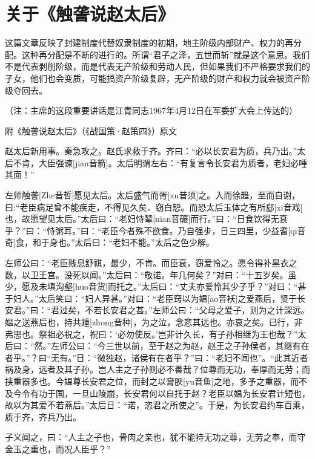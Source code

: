\section[关于《触詟说赵太后》（一九六七年四月）]{关于《触詟说赵太后》}


这篇文章反映了封建制度代替奴隶制度的初期，地主阶级内部财产、权力的再分配。这种再分配是不断的进行的。所谓“君子之泽，五世而斩”就是这个意思。我们不是代表剥削阶级，而是代表无产阶级和劳动人民，但如果我们不严格要求我们的子女，他们也会变质，可能搞资产阶级复辟，无产阶级的财产和权力就会被资产阶级夺回去。

（注：主席的这段重要讲话是江青同志1967年4月12日在军委扩大会上传达的）

附《触詟说赵太后》（《战国策·赵策四》）原文

赵太后新用事。秦急攻之。赵氏求救于齐。齐曰：“必以长安君为质，兵乃出。”太后不肯，大臣强谏[jian音箭]。太后明谓左右：“有复言令长安君为质者，老妇必唾其面！”

左师触詟[Zhe音哲]愿见太后。太后盛气而胥[xu昔须]之。入而徐趋，至而自谢，曰:“老臣病足曾不能疾走，不得见久矣．窃白恕。而恐太后玉体之有所郄[xi音戏]也，故愿望见太后。”太后曰：“老妇恃辇[nian音碾]而行。”曰：“日食饮得无衰乎？”曰：“恃粥耳。”曰：“老臣今者殊不欲食。乃自强步，日三四里，少益耆[qi音奇]食，和于身也。”太后曰：“老妇不能。”太后之色少解。

左师公曰：“老臣贱息舒祺，最少，不肯。而臣衰，窃爱怜之。愿令得补黑衣之数，以卫王宫。没死以闻。”太后曰：“敬诺。年几何矣？”对曰：“十五岁矣。虽少，愿及未填沟壑[huo音货]而托之。”太后曰：“丈夫亦爱怜其少子乎？”对曰：“甚于妇人。”太后笑曰：“妇人异甚。”对曰：“老臣窍以为媪[ao音袄]之爱燕后，贤于长安君。”曰：“君过矣，不若长安君之甚。”左师公曰：“父母之爱子，则为之计深远。媪之送燕后也，持共踵[zhong音种]，为之泣，念悲其远也。亦哀之矣。已行，非弗思也。祭祖必祝之，祝曰：‘必勿使反。’岂非计久长，有子孙相继为王也哉？”太后曰：“然。”左师公曰：“今三世以前，至于赵之为赵，赵王之子孙侯者，其继有在者乎。”？曰“无有。”日：“微独赵，诸侯有在者乎？”曰：“老妇不闻也”。“此其近者祸及身，远者及其子孙。岂人主之子孙则必不善哉？位尊而无功，奉厚而无劳；而挟重器多也。今媪尊长安君之位，而封之以膏腴[yu音鱼]之地，多予之重器，而不及今令有功于国，一旦山陵崩，长安君何以自托于赵？老臣以媪为长安君计短也，故以为其爱不若燕后。”太后日：“诺，恣君之所使之”。于是，为长安君约车百乘，质于齐，齐兵乃出。

子义闻之，曰：“人主之子也，骨肉之亲也，犹不能持无功之尊，无劳之奉，而守金玉之重也，而况人臣乎？”


